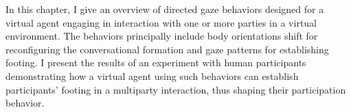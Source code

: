 In this chapter, I give an overview of directed gaze behaviors designed for a virtual agent engaging in interaction with one or more parties in a virtual environment. The behaviors principally include body orientations shift for reconfiguring the conversational formation and gaze patterns for establishing footing. I present the results of an experiment with human participants demonstrating how a virtual agent using such behaviors can establish participants' footing in a multiparty interaction, thus shaping their participation behavior.
